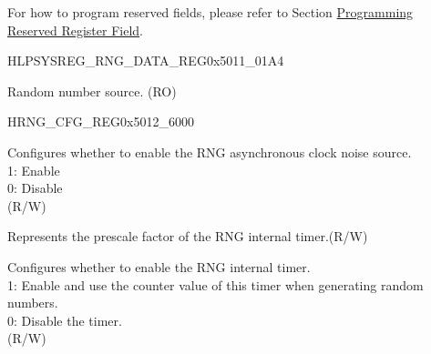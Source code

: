 \documentclass[main\_\_EN.tex]{subfiles}
\begin{document}
For how to program reserved fields, please refer to Section \hyperref[programming-reserved-field]{Programming Reserved Register Field}.

\begin{register}{H}{LPSYSREG\_RNG\_DATA\_REG}{0x5011\_01A4}\label{regdesc:LPSYSREGRNGDATAREG}
%
\regnewline%
\begin{regdesc}\begin{reglist}
\label{fielddesc:LPSYSREGRNGDATA}\item [LPSYSREG\_RNG\_DATA] Random number source. (RO)
\end{reglist}\end{regdesc}
\end{register}


\begin{register}{H}{RNG\_CFG\_REG}{0x5012\_6000}\label{regdesc:RNGCFGREG}
%
%
%
%
\regnewline%
\begin{regdesc}\begin{reglist}

\label{fielddesc:RNGSAMPLEENABLE}\item [RNG\_SAMPLE\_ENABLE]
Configures whether to enable the RNG asynchronous clock noise source.\\
1: Enable\\
0: Disable \\(R/W)

\label{fielddesc:RNGTIMERPSCALE}\item [RNG\_TIMER\_PSCALE] Represents the prescale factor of the RNG internal timer.(R/W)

\label{fielddesc:RNGTIMEREN}\item [RNG\_RTC\_TIMER\_EN] Configures whether to enable the RNG internal timer. \\
1: Enable and use the counter value of this timer when generating random numbers. \\
0: Disable the timer. \\
(R/W)

\end{reglist}\end{regdesc}
\end{register}
\end{document}

